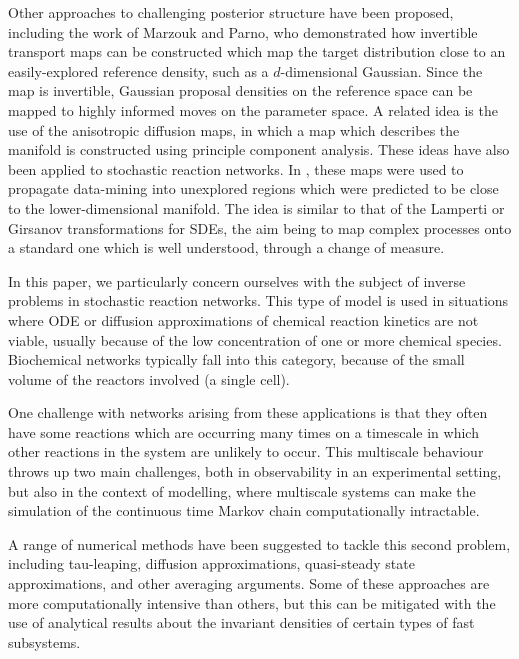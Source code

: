 \documentclass[final]{siamltex}
\begin{document}
Other approaches to challenging posterior structure have been
proposed, including the work of Marzouk and Parno\cite{parno2014transport}, who
demonstrated how invertible transport maps can be constructed which
map the target distribution close to an easily-explored reference
density, such as a $d$-dimensional Gaussian. Since the map is
invertible, Gaussian proposal densities on the reference space can be
mapped to highly informed moves on the parameter space. A related idea
is the use of the anisotropic diffusion maps\cite{singer2008non}, in
which a map which describes the manifold is constructed using
principle component analysis. These ideas have also been applied to
stochastic reaction
networks\cite{singer2009detecting,dsilva2016data}. In
\cite{chiavazzo2017intrinsic}, these maps were used to propagate
data-mining into unexplored regions which were predicted to be close
to the lower-dimensional manifold. The idea is similar to that of the
Lamperti or Girsanov transformations for SDEs\cite{flandrin2003stationarity,gardiner2009stochastic},  the aim being to map complex
processes onto a standard one which is well understood, through a
change of measure.

In this paper, we particularly concern ourselves with the subject of
inverse problems in stochastic reaction networks. This type of model
is used in situations where ODE or diffusion\cite{gillespie2000chemical}
approximations of chemical reaction kinetics are not viable, usually
because of the low concentration of one or more chemical
species\cite{gillespie1977exact}. Biochemical networks typically fall into
this category, because of the small volume of the reactors involved (a
single cell).

One challenge with networks arising from these applications is that
they often have some reactions which are occurring many times on a
timescale in which other reactions in the system are unlikely to
occur. This multiscale behaviour throws up two main challenges, both
in observability in an experimental setting, but also in the context
of modelling, where multiscale systems can make the simulation of the
continuous time Markov chain computationally intractable.

A range of numerical methods have been suggested to tackle this second
problem, including tau-leaping\cite{rathinam2003stiffness,cao2006efficient}, diffusion approximations\cite{erban2006gene,cotter2011constrained,cotter2016error}, quasi-steady state
approximations\cite{weinan2007nested,cao2005slow}, and other averaging
arguments\cite{cotter2016constrained}. Some of these approaches are more
computationally intensive than others, but this can be mitigated with the
use of analytical results about the invariant densities of certain
types of fast subsystems\cite{jahnke2007solving,anderson2010product,anderson2016product}.
\end{document}
